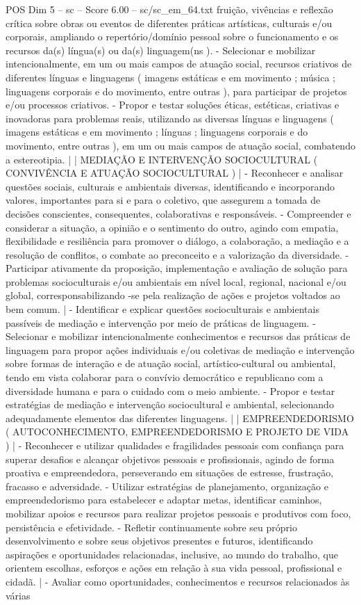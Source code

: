 \begin{textsample}{POS Dim 5 – sc – Score 6.00 – sc/sc\_em\_64.txt}
fruição, vivências e reflexão crítica sobre obras ou eventos de diferentes práticas artísticas, culturais e/ou corporais, ampliando o repertório/domínio pessoal sobre o funcionamento e os recursos da(s) língua(s) ou da(s) linguagem(ns ). - Selecionar e mobilizar intencionalmente, em um ou mais campos de atuação social, recursos criativos de diferentes línguas e linguagens ( imagens estáticas e em movimento ; música ; linguagens corporais e do movimento, entre outras ), para participar de projetos e/ou processos criativos. - Propor e testar soluções éticas, estéticas, criativas e inovadoras para problemas reais, utilizando as diversas línguas e linguagens ( imagens estáticas e em movimento ; línguas ; linguagens corporais e do movimento, entre outras ), em um ou mais campos de atuação social, combatendo a estereotipia. | | MEDIAÇÃO E INTERVENÇÃO SOCIOCULTURAL ( CONVIVÊNCIA E ATUAÇÃO SOCIOCULTURAL ) | - Reconhecer e analisar questões sociais, culturais e ambientais diversas, identificando e incorporando valores, importantes para si e para o coletivo, que assegurem a tomada de decisões conscientes, consequentes, colaborativas e responsáveis. - Compreender e considerar a situação, a opinião e o sentimento do outro, agindo com empatia, flexibilidade e resiliência para promover o diálogo, a colaboração, a mediação e a resolução de conflitos, o combate ao preconceito e a valorização da diversidade. - Participar ativamente da proposição, implementação e avaliação de solução para problemas socioculturais e/ou ambientais em nível local, regional, nacional e/ou global, corresponsabilizando -se pela realização de ações e projetos voltados ao bem comum. | - Identificar e explicar questões socioculturais e ambientais passíveis de mediação e intervenção por meio de práticas de linguagem. - Selecionar e mobilizar intencionalmente conhecimentos e recursos das práticas de linguagem para propor ações individuais e/ou coletivas de mediação e intervenção sobre formas de interação e de atuação social, artístico-cultural ou ambiental, tendo em vista colaborar para o convívio democrático e republicano com a diversidade humana e para o cuidado com o meio ambiente. - Propor e testar estratégias de mediação e intervenção sociocultural e ambiental, selecionando adequadamente elementos das diferentes linguagens. | | EMPREENDEDORISMO ( AUTOCONHECIMENTO, EMPREENDEDORISMO E PROJETO DE VIDA ) | - Reconhecer e utilizar qualidades e fragilidades pessoais com confiança para superar desafios e alcançar objetivos pessoais e profissionais, agindo de forma proativa e empreendedora, perseverando em situações de estresse, frustração, fracasso e adversidade. - Utilizar estratégias de planejamento, organização e empreendedorismo para estabelecer e adaptar metas, identificar caminhos, mobilizar apoios e recursos para realizar projetos pessoais e produtivos com foco, persistência e efetividade. - Refletir continuamente sobre seu próprio desenvolvimento e sobre seus objetivos presentes e futuros, identificando aspirações e oportunidades relacionadas, inclusive, ao mundo do trabalho, que orientem escolhas, esforços e ações em relação à sua vida pessoal, profissional e cidadã. | - Avaliar como oportunidades, conhecimentos e recursos relacionados às várias 
\end{textsample}

